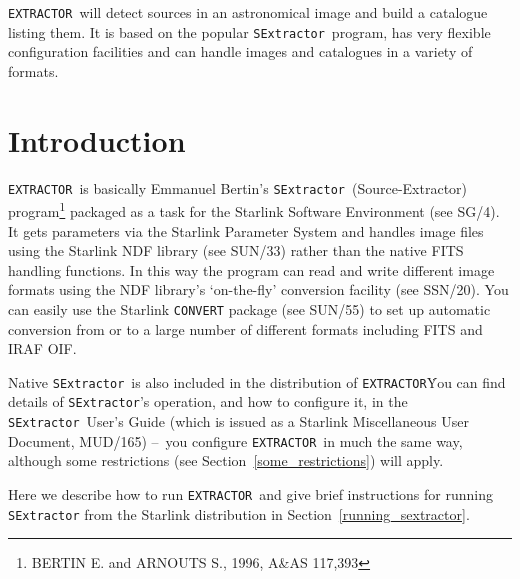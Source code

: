 \documentclass[twoside,11pt]{article}
\newcommand{\stardocinitials}  {SUN}
\newcommand{\stardocnumber}    {225.1}
\newcommand{\stardocabstract}  {\EXTRACTOR\ will detect sources in
an astronomical image and build a catalogue listing them. It is based on the
popular \SExtractor\ program, has very flexible configuration 
facilities and can handle images and catalogues in a variety of formats.}
\newcommand{\stardocname}{\stardocinitials /\stardocnumber}
\newcommand{\htmladdnormallink}[2]{#1}
\newcommand{\htmlref}[2]{#1}
\newenvironment{latexonly}{}{}
\newcommand{\latex}[1]{#1}
\newcommand{\xref}[3]{#1}
\newcommand{\xlabel}[1]{}
\renewcommand{\_}{\texttt{\symbol{95}}}
\newcommand{\EXTRACTOR}{\texttt{EXTRACTOR}}
\newcommand{\CONVERT}{\texttt{CONVERT}}
\newcommand{\SExtractor}{\texttt{SExtractor}}
\newcommand{\IRAFURL}{http://star-www.rl.ac.uk/iraf/web/iraf-homepage.html}
\newcommand{\FITSURL}{http://fits.gsfc.nasa.gov/}
\newcommand{\MUD}{mud165.ps}
\newcommand{\dash}{--}
\newcommand{\dash}{-}
\renewcommand{\thepage}{\roman{page}}
\begin{document}
\stardocabstract
  \newpage
  \begin{latexonly}
    \setlength{\parskip}{0mm}
    \tableofcontents
    \setlength{\parskip}{\medskipamount}
    \markboth{\stardocname}{\stardocname}
  \end{latexonly}
\cleardoublepage
\renewcommand{\thepage}{\arabic{page}}
\setcounter{page}{1}

\section{\xlabel{introduction}\label{introduction}Introduction}
\EXTRACTOR\ is basically Emmanuel Bertin's \SExtractor\ (Source-Extractor)
program\footnote{BERTIN E. and ARNOUTS S., 1996, A\&AS 117,393}
packaged as a task for the 
\xref{Starlink Software Environment}{sg4}{}\latex{ (see SG/4)}.
It gets parameters via the Starlink Parameter System and handles image files 
using the Starlink 
\xref{NDF}{sun33}{abstract}
library \latex{(see SUN/33)}
rather than the native FITS handling functions. In this way the program
can read and write different image formats using the NDF library's
\xref{`on-the-fly' conversion facility}{ssn20}{abstract}\latex{ (see SSN/20)}.
You can easily use the Starlink
\xref{\CONVERT}{sun55}{abstract}
package \latex{(see SUN/55)} to set up automatic conversion from or to 
\xref{a large number of different formats}{sun55}{the_default_conversion_commands}
including 
\htmladdnormallink{FITS}{\FITSURL}
and 
\htmladdnormallink{IRAF}{\IRAFURL}
OIF.

Native \SExtractor\ is also included in the distribution of \EXTRACTOR\.
You can find details of \SExtractor's operation, and how to configure it, in 
the 
\htmladdnormallink{\SExtractor\ User's Guide}{\MUD} 
(which is issued as a Starlink Miscellaneous User Document, MUD/165) 
\dash\ you configure \EXTRACTOR\ in much the same way, although 
\htmlref{some restrictions}{some_restrictions}\latex{ (see
Section~\ref{some_restrictions})} will apply.

Here we describe how to run \EXTRACTOR\, and give brief
\htmlref{instructions for running \SExtractor}{running_sextractor}
from the Starlink distribution\latex{ in Section~\ref{running_sextractor}}.
\end{document}
